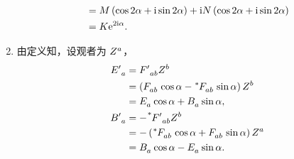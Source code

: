 \begin{xiti}
\begin{zm}
\begin{enumerate}[label = (\alph*)]
\begin{equation*}
\begin{split}
					&= M \left( \cos 2\alpha + \mathrm{i} \sin 2 \alpha \right) + \mathrm{i} N \left( \cos 2 \alpha + \mathrm{i} \sin 2 \alpha \right)\\
					&= K \mathrm{e}^{2\mathrm{i} \alpha}.
				\end{split}
			\end{equation*}
			\item 由定义知，设观者为 $\tensor{Z}{^a}$，
			\begin{align*}
				\tensor{{E'}}{_a} &= \tensor{{F'}}{_a_b} \tensor{Z}{^b}\\
				&= \left( \tensor{F}{_a_b} \cos \alpha - \tensor[^*]{F}{_a_b} \sin \alpha \right) \tensor{Z}{^b}\\
				&= \tensor{E}{_a} \cos \alpha + \tensor{B}{_a} \sin \alpha,\\
				\tensor{{B'}}{_a} &= - \tensor[^*]{{F'}}{_a_b} \tensor{Z}{^b}\\
				&= - \left( \tensor[^*]{F}{_a_b} \cos \alpha + \tensor{F}{_a_b} \sin \alpha \right) \tensor{Z}{^a}\\
				&= \tensor{B}{_a} \cos \alpha - \tensor{E}{_a} \sin \alpha.
			\end{align*}
		\end{enumerate}
	\end{zm}
	
\end{xiti}

